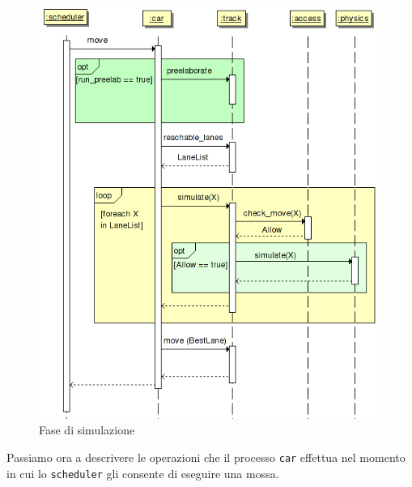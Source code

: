 \documentclass[11pt,a4paper]{report}
\begin{document}
\begin{figure}
\includegraphics[width=\textwidth]{diagrammi/Simulation}
\caption{Fase di simulazione}
\label{fig:simulation}
\end{figure}

Passiamo ora a descrivere le operazioni che il processo \texttt{car} effettua nel momento in cui lo \texttt{scheduler} gli consente di eseguire una mossa.
\end{document}
